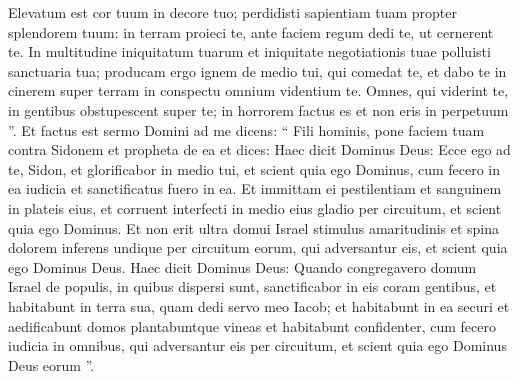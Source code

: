 \begin{biblechapter}
\begin{biblechapter}
\begin{biblechapter}
\begin{biblechapter}
\begin{biblechapter}
\begin{biblechapter}
\begin{biblechapter}
\begin{biblechapter}
\begin{biblechapter}
\begin{biblechapter}
\begin{biblechapter}
\begin{biblechapter}
\begin{biblechapter}
\begin{biblechapter}
\begin{biblechapter}
\begin{biblechapter}
\begin{biblechapter}
\begin{biblechapter}
\begin{biblechapter}
\begin{biblechapter}
\begin{biblechapter}
\begin{biblechapter}
\begin{biblechapter}
\begin{biblechapter}
\begin{biblechapter}
\begin{biblechapter}
\begin{biblechapter}
\begin{biblechapter}
 \verse Elevatum est cor tuum in decore tuo;
 perdidisti sapientiam tuam propter splendorem tuum:
 in terram proieci te,
 ante faciem regum dedi te, ut cernerent te.
 \verse In multitudine iniquitatum tuarum
 et iniquitate negotiationis tuae
 polluisti sanctuaria tua;
 producam ergo ignem de medio tui,
 qui comedat te,
 et dabo te in cinerem super terram
 in conspectu omnium videntium te.
 \verse Omnes, qui viderint te, in gentibus
 obstupescent super te;
 in horrorem factus es
 et non eris in perpetuum ”.
 \verse Et factus est sermo Domini ad me dicens: 
\verse “ Fili hominis, pone faciem tuam contra Sidonem et propheta de ea 
\verse et dices: Haec dicit Dominus Deus:
 Ecce ego ad te, Sidon,
 et glorificabor in medio tui,
 et scient quia ego Dominus,
 cum fecero in ea iudicia
 et sanctificatus fuero in ea.
 \verse Et immittam ei pestilentiam
 et sanguinem in plateis eius,
 et corruent interfecti in medio eius gladio per circuitum,
 et scient quia ego Dominus.
 \verse Et non erit ultra domui Israel stimulus amaritudinis et spina dolorem inferens undique per circuitum eorum, qui adversantur eis, et scient quia ego Dominus Deus.
 \verse Haec dicit Dominus Deus: Quando congregavero domum Israel de populis, in quibus dispersi sunt, sanctificabor in eis coram gentibus, et habitabunt in terra sua, quam dedi servo meo Iacob; 
\verse et habitabunt in ea securi et aedificabunt domos plantabuntque vineas et habitabunt confidenter, cum fecero iudicia in omnibus, qui adversantur eis per circuitum, et scient quia ego Dominus Deus eorum ”.
 

\end{biblechapter}
\end{biblechapter}
\end{biblechapter}
\end{biblechapter}
\end{biblechapter}
\end{biblechapter}
\end{biblechapter}
\end{biblechapter}
\end{biblechapter}
\end{biblechapter}
\end{biblechapter}
\end{biblechapter}
\end{biblechapter}
\end{biblechapter}
\end{biblechapter}
\end{biblechapter}
\end{biblechapter}
\end{biblechapter}
\end{biblechapter}
\end{biblechapter}
\end{biblechapter}
\end{biblechapter}
\end{biblechapter}
\end{biblechapter}
\end{biblechapter}
\end{biblechapter}
\end{biblechapter}
\end{biblechapter}

